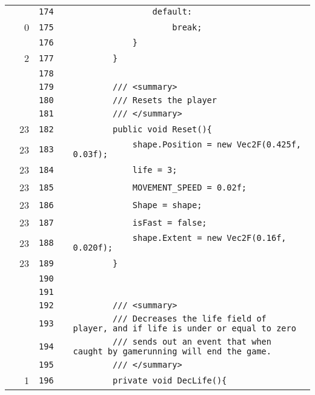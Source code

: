\documentclass[a4paper,landscape,10pt]{article}
\begin{document}
\begin{longtable}[l]{lrrll}
\cellcolor{gray} &  & \verb~174~ & & \verb~                default:~\\
\cellcolor{red} & 0 & \verb~175~ & & \verb~                    break;~\\
\cellcolor{gray} &  & \verb~176~ & & \verb~            }~\\
\cellcolor{green} & 2 & \verb~177~ & & \verb~        }~\\
\cellcolor{gray} &  & \verb~178~ & & \verb~~\\
\cellcolor{gray} &  & \verb~179~ & & \verb~        /// <summary>~\\
\cellcolor{gray} &  & \verb~180~ & & \verb~        /// Resets the player~\\
\cellcolor{gray} &  & \verb~181~ & & \verb~        /// </summary>~\\
\cellcolor{green} & 23 & \verb~182~ & & \verb~        public void Reset(){~\\
\cellcolor{green} & 23 & \verb~183~ & & \verb~            shape.Position = new Vec2F(0.425f, 0.03f);~\\
\cellcolor{green} & 23 & \verb~184~ & & \verb~            life = 3;~\\
\cellcolor{green} & 23 & \verb~185~ & & \verb~            MOVEMENT_SPEED = 0.02f;~\\
\cellcolor{green} & 23 & \verb~186~ & & \verb~            Shape = shape;~\\
\cellcolor{green} & 23 & \verb~187~ & & \verb~            isFast = false;~\\
\cellcolor{green} & 23 & \verb~188~ & & \verb~            shape.Extent = new Vec2F(0.16f, 0.020f);~\\
\cellcolor{green} & 23 & \verb~189~ & & \verb~        }~\\
\cellcolor{gray} &  & \verb~190~ & & \verb~~\\
\cellcolor{gray} &  & \verb~191~ & & \verb~~\\
\cellcolor{gray} &  & \verb~192~ & & \verb~        /// <summary>~\\
\cellcolor{gray} &  & \verb~193~ & & \verb~        /// Decreases the life field of player, and if life is under or equal to zero~\\
\cellcolor{gray} &  & \verb~194~ & & \verb~        /// sends out an event that when caught by gamerunning will end the game.~\\
\cellcolor{gray} &  & \verb~195~ & & \verb~        /// </summary>~\\
\cellcolor{green} & 1 & \verb~196~ & & \verb~        private void DecLife(){~\\

\end{longtable}
\end{document}
